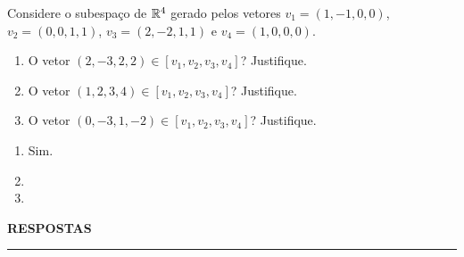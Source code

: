 \documentclass[12pt]{exam}
\begin{document}
\begin{exercicio}
	Considere o subespa\c{c}o de $\mathbb{R}^4$ gerado pelos vetores $v_1 = (1, -1, 0, 0)$, $v_2 = (0, 0, 1, 1)$, $v_3 = (2, -2, 1, 1)$ e $v_4 = (1, 0, 0, 0)$.
	\begin{enumerate}[label={\alph*})]
		\item O vetor $(2, -3, 2, 2) \in [v_1, v_2, v_3, v_4]$? Justifique.

        \item O vetor $(1, 2, 3, 4) \in [v_1, v_2, v_3, v_4]$? Justifique.

        \item O vetor $(0, -3, 1, -2) \in [v_1, v_2, v_3, v_4]$? Justifique.
	\end{enumerate}
	\begin{solucao}
		\begin{enumerate}[label={\alph*})]
			\item Sim.
			\item
			\item
		\end{enumerate}
	\end{solucao}
\end{exercicio}

\newpage
{}

\begin{center}
{\large\bf RESPOSTAS}
\end{center}
\hrule

\end{document}
